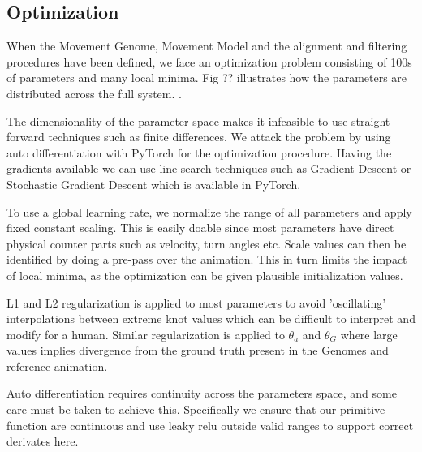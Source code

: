 \subsection{Optimization}
When the Movement Genome, Movement Model and the alignment and filtering procedures have been defined, we face an optimization problem consisting of 100s of parameters and many local minima. Fig ?? illustrates how the parameters are distributed across the full system. .

The dimensionality of the parameter space makes it infeasible to use straight forward techniques such as finite differences. We attack the problem by using auto differentiation with PyTorch for the optimization procedure. Having the gradients available we can use line search techniques such as Gradient Descent or Stochastic Gradient Descent which is available in PyTorch.

To use a global learning rate, we normalize the range of all parameters and apply fixed constant scaling. This is easily doable since most parameters have direct physical counter parts such as velocity, turn angles etc. Scale values can then be identified by doing a pre-pass over the animation. This in turn limits the impact of local minima, as the optimization can be given plausible initialization values.

L1 and L2 regularization is applied to most parameters to avoid 'oscillating' interpolations between extreme knot values which can be difficult to interpret and modify for a human. Similar regularization is applied to $\theta_a$ and $\theta_G$ where large values implies divergence from the ground truth present in the Genomes and reference animation.

Auto differentiation requires continuity across the parameters space, and some care must be taken to achieve this. Specifically we ensure that our primitive function are continuous and use leaky relu outside valid ranges to support correct derivates here. 

